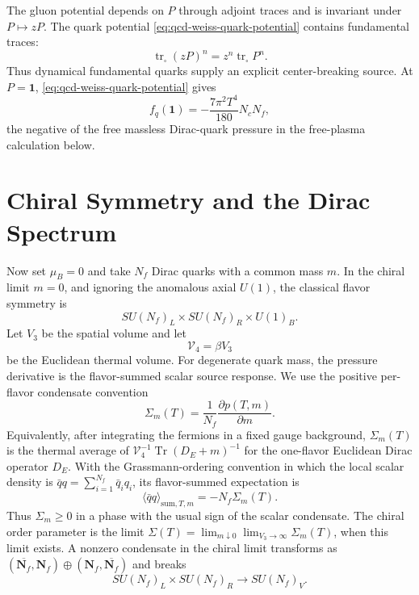 \begin{remark}
\label{rem:qcd-weiss-fundamental-quark-center-source}
The gluon potential depends on \(P\) through adjoint traces and is invariant
under \(P\mapsto zP\).  The quark potential
\eqref{eq:qcd-weiss-quark-potential} contains fundamental traces:
\[
  \operatorname{tr}_{\square}(zP)^n=z^n\operatorname{tr}_{\square}P^n .
\]
Thus dynamical fundamental quarks supply an explicit center-breaking source.
At \(P=\mathbf1\), \eqref{eq:qcd-weiss-quark-potential} gives
\begin{equation}
  f_q(\mathbf1)
  =
  -\frac{7\pi^2T^4}{180}N_cN_f,
  \label{eq:qcd-weiss-free-quark-free-energy}
\end{equation}
the negative of the free massless Dirac-quark pressure in
the free-plasma calculation below.
\end{remark}

\section{Chiral Symmetry and the Dirac Spectrum}

Now set \(\mu_B=0\) and take \(N_f\) Dirac quarks with a common mass \(m\).
In the chiral limit \(m=0\), and ignoring the anomalous axial \(U(1)\), the
classical flavor symmetry is
\[
  SU(N_f)_L\times SU(N_f)_R\times U(1)_B .
\]
Let \(V_3\) be the spatial volume and let
\[
  \mathcal V_4=\beta V_3
\]
be the Euclidean thermal volume.  For degenerate quark mass, the pressure
derivative is the flavor-summed scalar source response.  We use the positive
per-flavor condensate convention
\begin{equation}
  \Sigma_m(T)
  =
  \frac1{N_f}\frac{\partial p(T,m)}{\partial m}.
  \label{eq:qcd-phase-chiral-condensate-source}
\end{equation}
Equivalently, after integrating the fermions in a fixed gauge background,
\(\Sigma_m(T)\) is the thermal average of
\(\mathcal V_4^{-1}\operatorname{Tr}(D_E+m)^{-1}\) for the one-flavor
Euclidean Dirac operator \(D_E\).  With the Grassmann-ordering convention in
which the local scalar density is
\(\bar q q=\sum_{i=1}^{N_f}\bar q_iq_i\), its flavor-summed expectation is
\[
  \langle\bar q q\rangle_{\mathrm{sum},T,m}
  =
  -N_f\Sigma_m(T).
\]
Thus \(\Sigma_m\ge0\) in a phase with the usual sign of the scalar condensate.
The chiral order parameter is the limit \(\Sigma(T)=\lim_{m\downarrow0}
\lim_{V_3\to\infty}\Sigma_m(T)\), when this limit exists.  A nonzero
condensate in the chiral limit transforms as
\((\overline{\mathbf N_f},\mathbf N_f)\oplus
(\mathbf N_f,\overline{\mathbf N_f})\) and breaks
\[
  SU(N_f)_L\times SU(N_f)_R
  \longrightarrow
  SU(N_f)_V .
\]


